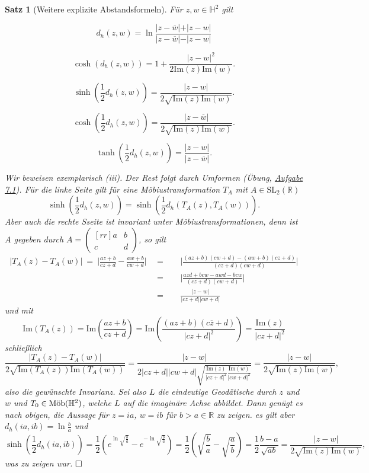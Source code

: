 \documentclass[11pt]{book}
\numberwithin{dummy}{section}
\newtheorem{theorem}{Satz}[section]
\theoremstyle{nonumberbreak}
\newenvironment{pr}[1][]{\ifthenelse{\equal{#1}{}}{\proof}{\proof[#1]}\rm}{\endproof}
\newcommand{\R}{\mathbb{R}}
\newcommand{\He}{\mathbb{H}}
\newcommand{\amob}{\textup{Möb}}
\newcommand{\matx}[4]{\begin{pmatrix}[rr]#1 & #2 \\[-6pt] #3 & #4 \end{pmatrix}}
\begin{document}
\begin{spacing}{1.4}
\hypertarget{satzzweiviervier}{}
\begin{theorem}[Weitere explizite Abstandsformeln]    %
Für $z,w \in \He^2$ gilt
\begin{compactenum}
\item $$d_h(z,w) = \ln \frac{\vert z - \overline{w} \vert + \vert z-w \vert}{\vert z - \overline{w}\vert - \vert z - w \vert}$$
\item $$ \cosh \left( d_h(z,w)\right) = 1 + \frac{ \vert z-w \vert^2}{ 2 \mathrm{Im}(z) \mathrm{Im}(w)}.$$
\item $$\sinh\left( \frac{1}{2} d_h(z,w)\right) = \frac{\vert z - w \vert}{2 \sqrt{\mathrm{Im}(z) \mathrm{Im}(w)}}.$$
\item $$\cosh\left( \frac{1}{2} d_h(z,w)\right) = \frac{ \vert z - \overline{w}\vert}{2 \sqrt{\mathrm{Im}(z) \mathrm{Im}(w)}}.$$
\item $$\tanh\left( \frac{1}{2} d_h(z,w)\right) = \frac{\vert z - w \vert }{\vert z - \overline{w}\vert}.$$
\end{compactenum}
\begin{pr}
Wir beweisen exemplarisch (iii). Der Rest folgt durch Umformen (Übung, \hyperlink{Asiebeneins}{Aufgabe 7.1}). Für die linke Seite gilt für eine Möbiustransformation $T_A$ mit $A \in \mathrm{SL}_2(\R)$
$$\sinh \left( \frac{1}{2} d_h(z,w)\right) = \sinh \left( \frac{1}{2} d_h(T_A(z), T_A(w))\right).$$
Aber auch die rechte Sseite ist invariant unter Möbiustransformationen, denn 
ist $A$ gegeben durch $A=\matx{a}{b}{c}{d}$, so gilt
\begin{alignat*}{5}
\vert T_A(z)-T_A(w)\vert \ = \ \Bigg \vert \frac{az+b}{cz+d} - \frac{aw+b}{cw+d}\Bigg \vert \ \ &=&& \ \ \Bigg\vert \frac{(az+b)(cw+d)-(aw+b)(cz+d)}{(cz+d)(cw+d)} \Bigg \vert \\
&=&& \ \ \Bigg\vert \frac{azd+bcw-awd-bcw}{(cz+d)(cw+d)} \Bigg \vert \\
&=&& \ \ \frac{\vert z-w \vert}{\vert cz+d\vert \vert cw+d\vert}
\end{alignat*}
und mit $$\mathrm{Im}(T_A(z)) =\mathrm{Im}\left( \frac{az+b}{cz+d}\right) = \mathrm{Im}\left( \frac{(az+b)(c\overline{z}+d)}{\vert cz+d\vert^2}\right) =   \frac{\mathrm{Im}(z)}{\vert cz+d\vert^2}$$
schließlich
$$\frac{\vert T_A(z)-T_A(w)\vert}{2 \sqrt{\mathrm{Im}(T_A(z)) \mathrm{Im}(T_A(w))}} = \frac{\vert z - w\vert}{2 \vert cz+d \vert \vert cw+d\vert \sqrt{\frac{\mathrm{Im}(z)}{\vert cz+d\vert^2} \frac{\mathrm{Im}(w)}{\vert cw+d\vert^2}}} = \frac{\vert z - w \vert}{2 \sqrt{\mathrm{Im}(z)\mathrm{Im}(w)}},$$
also die gewünschte Invarianz.
Sei also $L$ die eindeutige Geodätische durch $z$ und $w$ und $T_0\in \amob(\He^2)$, welche $L$ auf die imaginäre Achse abbildet. Dann genügt es nach obigen, die Aussage für $z=ia$, $w=ib$ für $b>a \in \R$ zu zeigen. es gilt aber $d_h(ia, ib) = \ln \frac{b}{a}$ und 
$$\sinh\left( \frac{1}{2} d_h(ia, ib)\right) = \frac{1}{2} \left( e^{\ln \sqrt{\frac{b}{a}}} - e^{- \ln \sqrt{\frac{b}{a}}} \right) = \frac{1}{2} \left( \sqrt{\frac{b}{a}} - \sqrt{\frac{a}{b}} \right) = \frac{1}{2} \frac{b-a}{\sqrt{ab}}= \frac{\vert z-w\vert}{2 \sqrt{\mathrm{Im}(z) \mathrm{Im}(w)}},$$
was zu zeigen war. $\hfill \Box$



\end{pr}
\end{theorem}
\end{spacing}
\end{document}
